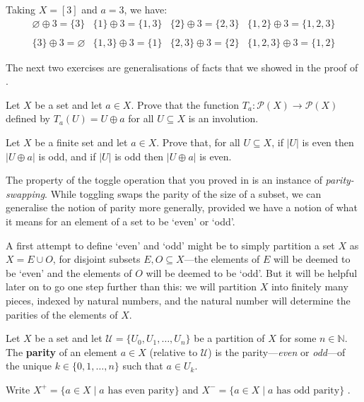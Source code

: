 \begin{example}
Taking $X = [3]$ and $a = 3$, we have:
\[
\begin{matrix}
\varnothing \oplus 3 = \{ 3 \} & \{ 1 \} \oplus 3 = \{ 1, 3 \} & \{ 2 \} \oplus 3 = \{ 2, 3 \} & \{ 1, 2 \} \oplus 3 = \{ 1, 2, 3 \} \\
~&~&~&~ \\
\{ 3 \} \oplus 3 = \varnothing & \{ 1,3 \} \oplus 3 = \{ 1 \} & \{ 2, 3 \} \oplus 3 = \{ 2 \} & \{ 1, 2, 3 \} \oplus 3 = \{ 1, 2 \}
\end{matrix}
\]
\end{example}

The next two exercises are generalisations of facts that we showed in the proof of .

\begin{exercise}
\label{exToggleIsInvolution}
Let $X$ be a set and let $a \in X$. Prove that the function $T_a : \mathcal{P}(X) \to \mathcal{P}(X)$ defined by $T_a(U) = U \oplus a$ for all $U \subseteq X$ is an involution.
\end{exercise}

\begin{exercise}
\label{exToggleSwapsParity}
Let $X$ be a finite set and let $a \in X$. Prove that, for all $U \subseteq X$, if $|U|$ is even then $|U \oplus a|$ is odd, and if $|U|$ is odd then $|U \oplus a|$ is even.
\end{exercise}

The property of the toggle operation that you proved in  is an instance of \textit{parity-swapping}. While toggling swaps the parity of the size of a subset, we can generalise the notion of parity more generally, provided we have a notion of what it means for an element of a set to be `even' or `odd'.

A first attempt to define `even' and `odd' might be to simply partition a set $X$ as $X = E \cup O$, for disjoint subsets $E, O \subseteq X$---the elements of $E$ will be deemed to be `even' and the elements of $O$ will be deemed to be `odd'. But it will be helpful later on to go one step further than this: we will partition $X$ into finitely many pieces, indexed by natural numbers, and the natural number will determine the parities of the elements of $X$.

\begin{definition}
\label{defParity}
Let $X$ be a set and let $\mathcal{U} = \{ U_0, U_1, \dots, U_n \}$ be a partition of $X$ for some $n \in \mathbb{N}$. The \textbf{parity} of an element $a \in X$ (relative to $\mathcal{U}$) is the parity---\textit{even} or \textit{odd}---of the unique $k \in \{ 0, 1, \dots, n \}$ such that $a \in U_k$.

Write $X^+ = \{ a \in X \mid a \text{ has even parity} \}$  and $X^- = \{ a \in X \mid a \text{ has odd parity} \}$ .
\end{definition}


